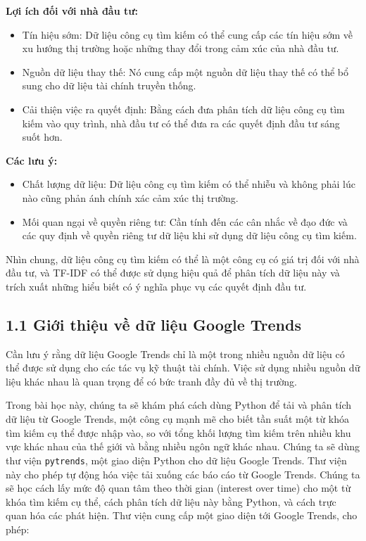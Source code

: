 \textbf{Lợi ích đối với nhà đầu tư:}

\begin{itemize}
  \item Tín hiệu sớm: Dữ liệu công cụ tìm kiếm có thể cung cấp các tín hiệu sớm về xu hướng thị trường hoặc những thay đổi trong cảm xúc của nhà đầu tư.
  \item Nguồn dữ liệu thay thế: Nó cung cấp một nguồn dữ liệu thay thế có thể bổ sung cho dữ liệu tài chính truyền thống.
  \item Cải thiện việc ra quyết định: Bằng cách đưa phân tích dữ liệu công cụ tìm kiếm vào quy trình, nhà đầu tư có thể đưa ra các quyết định đầu tư sáng suốt hơn.
\end{itemize}

\textbf{Các lưu ý:}

\begin{itemize}
  \item Chất lượng dữ liệu: Dữ liệu công cụ tìm kiếm có thể nhiễu và không phải lúc nào cũng phản ánh chính xác cảm xúc thị trường.
  \item Mối quan ngại về quyền riêng tư: Cần tính đến các cân nhắc về đạo đức và các quy định về quyền riêng tư dữ liệu khi sử dụng dữ liệu công cụ tìm kiếm.
\end{itemize}

Nhìn chung, dữ liệu công cụ tìm kiếm có thể là một công cụ có giá trị đối với nhà đầu tư, và TF-IDF có thể được sử dụng hiệu quả để phân tích dữ liệu này và trích xuất những hiểu biết có ý nghĩa phục vụ các quyết định đầu tư.

\subsection*{1.1 Giới thiệu về dữ liệu Google Trends}

Cần lưu ý rằng dữ liệu Google Trends chỉ là một trong nhiều nguồn dữ liệu có thể được sử dụng cho các tác vụ kỹ thuật tài chính. Việc sử dụng nhiều nguồn dữ liệu khác nhau là quan trọng để có bức tranh đầy đủ về thị trường.

Trong bài học này, chúng ta sẽ khám phá cách dùng Python để tải và phân tích dữ liệu từ Google Trends, một công cụ mạnh mẽ cho biết tần suất một từ khóa tìm kiếm cụ thể được nhập vào, so với tổng khối lượng tìm kiếm trên nhiều khu vực khác nhau của thế giới và bằng nhiều ngôn ngữ khác nhau. Chúng ta sẽ dùng thư viện \texttt{pytrends}, một giao diện Python cho dữ liệu Google Trends. Thư viện này cho phép tự động hóa việc tải xuống các báo cáo từ Google Trends. Chúng ta sẽ học cách lấy mức độ quan tâm theo thời gian (interest over time) cho một từ khóa tìm kiếm cụ thể, cách phân tích dữ liệu này bằng Python, và cách trực quan hóa các phát hiện. Thư viện cung cấp một giao diện tới Google Trends, cho phép:

